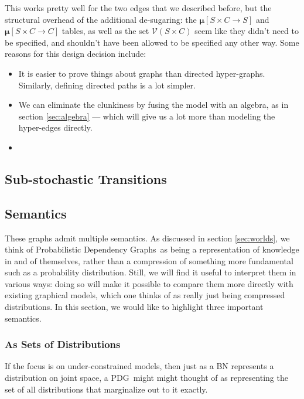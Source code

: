 \documentclass{article}
\newcommand{\modelnames}{Probabilistic Dependency Graphs}
\newcommand{\MN}{PDG}
\begin{document}
	This works pretty well for the two edges that we described before, but the structural overhead of the additional de-sugaring: the $\boldsymbol\mu[S\times C\to S]$ and $\boldsymbol\mu[S\times C\to C]$ tables, as well as the set $\mathcal V(S \times C)$ seem like they didn't need to be specified, and shouldn't have been allowed to be specified any other way. Some reasons for this design decision include:
	\begin{itemize}[nosep]
		\item It is easier to prove things about graphs than directed hyper-graphs. Similarly, defining directed paths is a lot simpler.
		\item We can eliminate the clunkiness by fusing the model with an algebra, as in section \ref{sec:algebra} --- which will give us a lot more than modeling the hyper-edges directly.
		\item 
	\end{itemize}


	\subsection{Sub-stochastic Transitions}

	\subsection{Semantics}\label{sec:semantics}
	These graphs admit multiple semantics. As discussed in section \ref{sec:worlds}, we think of \modelnames\ as being a representation of knowledge in and of themselves, rather than a compression of something more fundamental such as a probability distribution. Still, we will find it useful to interpret them in various ways: doing so will make it possible to compare them more directly with existing graphical models, which one thinks of as really just being compressed distributions. In this section, we would like to highlight three important semantics.
	
	\subsubsection{As Sets of Distributions}\label{sec:set-of-distribution-semantics}
	If the focus is on under-constrained models, then just as a BN represents a distribution on joint space, a \MN\ might might thought of as representing the set of all distributions that marginalize out to it exactly.
	
\end{document}
